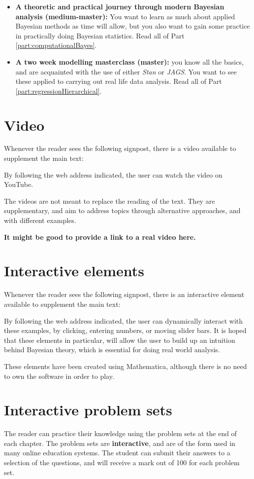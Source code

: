 \documentclass[11pt,fullpage]{book}
\begin{document}
\begin{itemize}
\item \textbf{A theoretic and practical journey through modern Bayesian analysis (medium-master):} You want to learn as much about applied Bayesian methods as time will allow, but you also want to gain some practice in practically doing Bayesian statistics. Read all of Part \ref{part:computationalBayes}.
\item \textbf{A two week modelling masterclass (master):} you know all the basics, and are acquainted with the use of either \textit{Stan} or \textit{JAGS\BUGS}. You want to see these applied to carrying out real life data analysis. Read all of Part \ref{part:regressionHierarchical}. 
\end{itemize}

\section{Video}
Whenever the reader sees the following signpost, there is a video available to supplement the main text:


By following the web address indicated, the user can watch the video on YouTube.

The videos are not meant to replace the reading of the text. They are supplementary, and aim to address topics through alternative approaches, and with different examples.

\textbf{It might be good to provide a link to a real video here.}

\section{Interactive elements}
Whenever the reader sees the following signpost, there is an interactive element available to supplement the main text:


By following the web address indicated, the user can dynamically interact with these examples, by clicking, entering numbers, or moving slider bars. It is hoped that these elements in particular, will allow the user to build up an intuition behind Bayesian theory, which is essential for doing real world analysis.

These elements have been created using Mathematica, although there is no need to own the software in order to play. 

\section{Interactive problem sets}
The reader can practice their knowledge using the problem sets at the end of each chapter. The problem sets are \textbf{interactive}, and are of the form used in many online education systems. The student can submit their answers to a selection of the questions, and will receive a mark out of 100 for each problem set.
\end{document}
